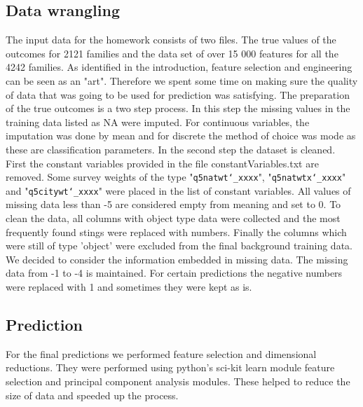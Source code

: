 \subsection{Data wrangling}
The input data for the homework consists of two files. The true values of the outcomes for 2121 families and the data set of over 15 000 features for all the 4242 families. As identified in the introduction, feature selection and engineering can be seen as an "art". Therefore we spent some time on making sure the quality of data that was going to be used for prediction was satisfying. 
The preparation of the true outcomes is a two step process. In this step the missing values in the training data listed as NA were imputed. For continuous variables, the imputation was done by mean and for discrete the method of choice was mode as these are classification parameters. In the second step the dataset is cleaned. First the constant variables provided in the file {\selectfont constantVariables.txt} are removed. Some survey weights of the type "\texttt{q5natwt\char`_xxxx}", "\texttt{q5natwtx\char`_xxxx}" and "\texttt{q5citywt\char`_xxxx}" were placed in the list of constant variables. All values of missing data less than -5 are considered empty from meaning and set to 0. To clean the data, all columns with object type data were collected and the most frequently found stings were replaced with numbers. Finally the columns which were still of type 'object' were excluded from the final background training data. We decided to consider the information embedded in missing data. The missing data from -1 to -4 is maintained. For certain predictions the negative numbers were replaced with 1 and sometimes they were kept as is.
\subsection{Prediction}
For the final predictions we performed feature selection and dimensional reductions. They were performed using python's sci-kit learn module \cite{scikit-learn} feature selection and principal component analysis modules. These helped to reduce the size of data and speeded up the process.

